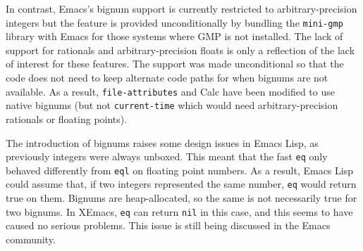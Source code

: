 \documentclass[format=acmsmall, review]{acmart}
\newcommand \Elisp {Emacs Lisp}
\begin{document}
In contrast, Emacs's bignum support is currently restricted to
arbitrary-precision integers but the feature is provided unconditionally by
bundling the \texttt{mini-gmp} library with Emacs for those systems where
GMP is not installed.  The lack of support for rationals and
arbitrary-precision floats is only a reflection of the lack of interest for
these features.  The support was made unconditional so that the code does
not need to keep alternate code paths for when bignums are not available.
As a result, \texttt{file-attributes} and Calc have been modified to use
native bignums (but not \texttt{current-time} which would need
arbitrary-precision rationals or floating points).

The introduction of bignums raises some design issues in \Elisp, as
previously integers were always unboxed.  This meant that the fast
\texttt{eq} only behaved differently from \texttt{eql} on floating point
numbers.  As a result, \Elisp{} could assume that, if two integers
represented the same number, \texttt{eq} would return true on them.
Bignums are heap-allocated, so the same is not necessarily true for two
bignums.  In XEmacs, \texttt{eq} can return \texttt{nil} in this case, and
this seems to have caused no serious problems.
This issue is still being discussed in the Emacs community.







\end{document}
